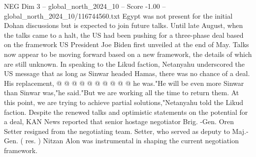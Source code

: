 \begin{textsample}{NEG Dim 3 – global\_north\_2024\_10 – Score -1.00 – global\_north\_2024\_10/116744560.txt}
Egypt was not present for the initial Dohan discussions but is expected to join future talks.
Until late August, when the talks came to a halt, the US had been pushing for a three-phase deal based on the framework US President Joe Biden first unveiled at the end of May.
Talks now appear to be moving forward based on a new framework, the details of which are still unknown.
In speaking to the Likud faction, Netanyahu underscored the US message that as long as Sinwar headed Hamas, there was no chance of a deal.
His replacement, @ @ @ @ @ @ @ @ @ @ he was."He will be even more Sinwar than Sinwar was,"he said."But we are working all the time to return them.
At this point, we are trying to achieve partial solutions,"Netanyahu told the Likud faction.
Despite the renewed talks and optimistic statements on the potential for a deal, KAN News reported that senior hostage negotiator Brig. -Gen.
Oren Setter resigned from the negotiating team.
Setter, who served as deputy to Maj.-Gen. ( res. ) Nitzan Alon was instrumental in shaping the current negotiation framework.

\end{textsample}
